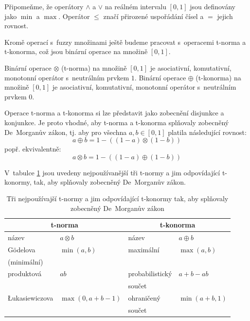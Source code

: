 Připomeňme, že operátory $\wedge$ a $\vee$ na reálném intervalu $[0, 1]$ jsou definovány jako $\min$ a $\max$. Operátor $\le$ značí přirozené uspořádání čísel a $=$ jejich rovnost.

Kromě operací s~fuzzy množinami ještě budeme pracovat s~operacemi t-norma a t-konorma, což jsou binární operace na množině $[0,1]$.
\begin{definition}
 Binární operace $\otimes$ (t-norma) na množině $[0,1]$ je asociativní, komutativní, monotonní operátor s~neutrálním prvkem $1$.
 Binární operace $\oplus$  (t-konorma) na množině $[0,1]$ je asociativní, komutativní, monotonní operátor s~neutrálním prvkem $0$.
\end{definition}

Operace t-norma a t-konorma si lze představit jako zobecnění disjunkce a konjunkce. Je proto vhodné, aby t-norma a t-konorma splňovaly zobecněný De~Morganův zákon, tj. aby pro všechna $a, b \in [0,1]$ platila následující rovnost:
$$
  a \oplus b = 1 - ((1 - a) \otimes (1 - b))
$$
popř. ekvivalentně:
$$
  a \otimes b = 1 - ((1 - a) \oplus (1 - b))
$$

V~tabulce \ref{tbl:Norms} jsou uvedeny nejpoužívanější tři t-normy a jim odpovídající t-konormy, tak, aby splňovaly zobecněný De~Morganův zákon.
\begin{table}
 \centering
 \begin{tabular}{|l|l||l|l|}
  \hline
  \multicolumn{2}{|c||}{t-norma}			& \multicolumn{2}{|c|}{t-konorma}			\\\hline 
  název	 		& $a \otimes b$		& název				& $a \oplus b$		\\\hline \hline
  Gödelova 		& $\min(a, b)$ 		& maximální 			& $\max(a, b)$		\\
  (minimální) 		&			&				&			\\\hline
  produktová 		& $a b$ 		& probabilistický  		& $a + b - a b$		\\
			&			& součet			&			\\\hline
  \L{}ukasiewiczova 	& $\max(0, a + b - 1)$ 	& ohraničený 			& $\min(a + b, 1)$	\\
			&			& součet			&			\\\hline
 \end{tabular}

 \caption[Tři nejpoužívajší t-normy]{Tři nejpoužívajší t-normy a jim odpovídající t-konormy tak, aby splňovaly zobecněný De~Morganův zákon}
 \label{tbl:Norms}
\end{table}

